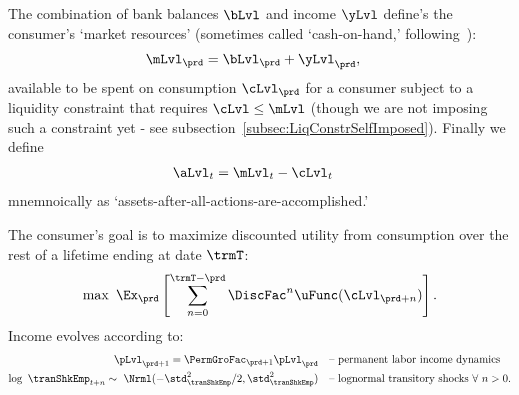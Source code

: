 The combination of bank balances $\bLvl$ and income $\yLvl$ define's the consumer's `market resources' (sometimes called `cash-on-hand,' following~\cite{deatonUnderstandingC}):
\begin{equation}\begin{gathered}\begin{aligned}
      \mLvl_{\prd} & = \bLvl_{\prd}+\yLvl_{\prd} \label{eq:mLvl},
    \end{aligned}\end{gathered}\end{equation}
available to be spent on consumption $\cLvl_{\prd}$ for a consumer subject to a liquidity constraint that requires $\cLvl \leq \mLvl$ (though we are not imposing such a constraint yet - see subsection~\ref{subsec:LiqConstrSelfImposed}).  Finally we define
  \begin{equation}\begin{gathered}\begin{aligned}\label{eq:aLvl}
    \aLvl_{t} & = \mLvl_{t}-\cLvl_{t} 
      \end{aligned}\end{gathered}\end{equation}
mnemnoically as `assets-after-all-actions-are-accomplished.' 

The consumer's goal is to maximize discounted utility from consumption over the rest of a lifetime ending at date $\trmT$:
  \begin{equation}\label{eq:MaxProb}
    \max~\Ex_{\prd}\left[\sum_{n=0}^{\trmT-\prd}\DiscFac^{n} \uFunc(\cLvl_{\prd+n})\right].
  \end{equation}
Income evolves according to:
  \begin{equation}\begin{gathered}\begin{aligned}
        \pLvl_{\prd+1}   = \PermGroFac_{\prd+1}\pLvl_{\prd}                                        & \text{~~ -- permanent labor income dynamics} \label{eq:permincgrow}
        \\ \log ~ \tranShkEmp_{t+n}  \sim ~\Nrml(-\std_{\tranShkEmp}^{2}/2,\std_{\tranShkEmp}^{2}) & \text{~~ -- lognormal transitory shocks}~\forall~n>0 .
      \end{aligned}\end{gathered}\end{equation}

